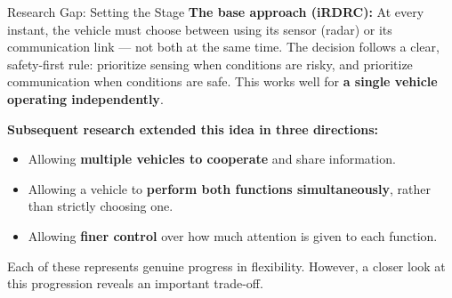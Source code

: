 \documentclass[aspectratio=169]{beamer}
\begin{document}
\begin{frame}{Research Gap: Setting the Stage}
  \textbf{The base approach (iRDRC):} At every instant, the vehicle must choose between using its sensor (radar) or its communication link --- not both at the same time. The decision follows a clear, safety-first rule: prioritize sensing when conditions are risky, and prioritize communication when conditions are safe. This works well for \textbf{a single vehicle operating independently}.

  \vspace{0.4cm}
  \textbf{Subsequent research extended this idea in three directions:}
  \begin{itemize}
    \item Allowing \textbf{multiple vehicles to cooperate} and share information.
    \item Allowing a vehicle to \textbf{perform both functions simultaneously}, rather than strictly choosing one.
    \item Allowing \textbf{finer control} over how much attention is given to each function.
  \end{itemize}

  \vspace{0.3cm}
  \small Each of these represents genuine progress in flexibility. However, a closer look at this progression reveals an important trade-off.
\end{frame}
\end{document}
